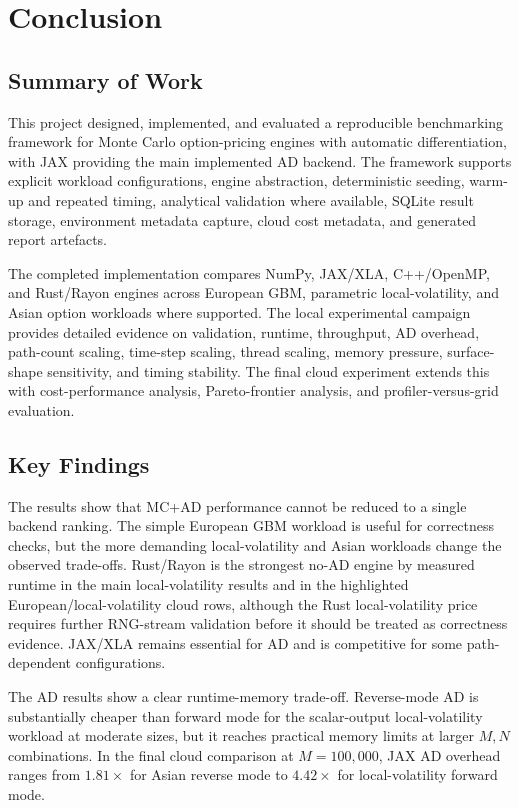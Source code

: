 \chapter{Conclusion}
\label{chap:conclusion}

\section{Summary of Work}

This project designed, implemented, and evaluated a reproducible benchmarking
framework for Monte Carlo option-pricing engines with automatic
differentiation, with JAX providing the main implemented AD backend. The framework supports explicit workload configurations,
engine abstraction, deterministic seeding, warm-up and repeated timing,
analytical validation where available, SQLite result storage, environment
metadata capture, cloud cost metadata, and generated report artefacts.

The completed implementation compares NumPy, JAX/XLA, C++/OpenMP, and
Rust/Rayon engines across European GBM, parametric local-volatility, and Asian
option workloads where supported. The local experimental campaign provides
detailed evidence on validation, runtime, throughput, AD overhead,
path-count scaling, time-step scaling, thread scaling, memory pressure,
surface-shape sensitivity, and timing stability. The final cloud experiment
extends this with cost-performance analysis, Pareto-frontier analysis, and
profiler-versus-grid evaluation.

\section{Key Findings}

The results show that MC+AD performance cannot be reduced to a single backend
ranking. The simple European GBM workload is useful for correctness checks, but
the more demanding local-volatility and Asian workloads change the observed
trade-offs. Rust/Rayon is the strongest no-AD engine by measured runtime in the main
local-volatility results and in the highlighted European/local-volatility cloud
rows, although the Rust local-volatility price requires further RNG-stream
validation before it should be treated as correctness evidence. JAX/XLA remains
essential for AD and is competitive for some path-dependent configurations.

The AD results show a clear runtime-memory trade-off. Reverse-mode AD is
substantially cheaper than forward mode for the scalar-output
local-volatility workload at moderate sizes, but it reaches practical memory
limits at larger \(M,N\) combinations. In the final cloud comparison at
\(M=100{,}000\), JAX AD overhead ranges from \(1.81\times\) for Asian reverse
mode to \(4.42\times\) for local-volatility forward mode.

